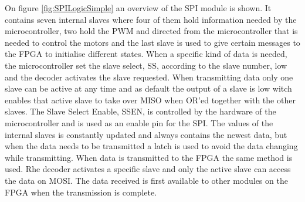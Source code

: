 \documentclass[../../main.tex]{subfiles}
\begin{document}
On figure \ref{fig:SPILogicSimple} an overview of the SPI module is shown. It contains seven internal slaves where four of them hold information needed by the microcontroller, two hold the PWM and directed from the microcontroller that is needed to control the motors and the last slave is used to give certain messages to the FPGA to initialise different states. When a specific kind of data is needed, the microcontroller set the slave select, SS, according to the slave number, low and the decoder activates the slave requested. When transmitting data only one slave can be active at any time and as default the output of a slave is low witch enables that active slave to take over MISO when OR'ed together with the other slaves. The Slave Select Enable, SSEN, is controlled by the hardware of the microcontroller and is used as an enable pin for the SPI. The values of the internal slaves is constantly updated and always contains the newest data, but when the data needs to be transmitted a latch is used to avoid the data changing while transmitting. 
When data is transmitted to the FPGA the same method is used. Rhe decoder activates a specific slave and only the active slave can access the data on MOSI. The data received is first available to other modules on the FPGA when the transmission is complete. 
\end{document}

